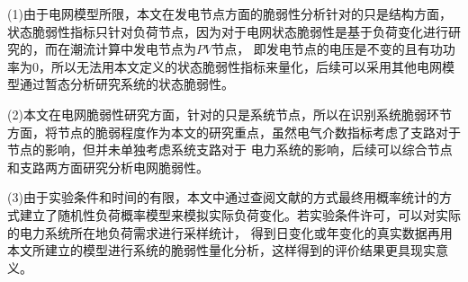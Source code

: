 (1)由于电网模型所限，本文在发电节点方面的脆弱性分析针对的只是结构方面，状态脆弱性指标只针对负荷节点，因为对于电网状态脆弱性是基于负荷变化进行研究的，而在潮流计算中发电节点为$PV$节点，
即发电节点的电压是不变的且有功功率为0，所以无法用本文定义的状态脆弱性指标来量化，后续可以采用其他电网模型通过暂态分析研究系统的状态脆弱性。

(2)本文在电网脆弱性研究方面，针对的只是系统节点，所以在识别系统脆弱环节方面，将节点的脆弱程度作为本文的研究重点，虽然电气介数指标考虑了支路对于节点的影响，但并未单独考虑系统支路对于
电力系统的影响，后续可以综合节点和支路两方面研究分析电网脆弱性。

(3)由于实验条件和时间的有限，本文中通过查阅文献的方式最终用概率统计的方式建立了随机性负荷概率模型来模拟实际负荷变化。若实验条件许可，可以对实际的电力系统所在地负荷需求进行采样统计，
得到日变化或年变化的真实数据再用本文所建立的模型进行系统的脆弱性量化分析，这样得到的评价结果更具现实意义。
